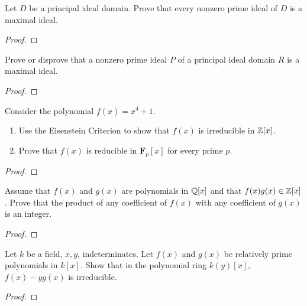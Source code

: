 \begin{problem}
  Let $D$ be a principal ideal domain. Prove that every nonzero
  prime ideal of $D$ is a maximal ideal.
\end{problem}
\begin{proof}
\end{proof}

\begin{problem}
  Prove or disprove that a nonzero prime ideal $P$ of a principal
  ideal domain $R$ is a maximal ideal.
\end{problem}
\begin{proof}
\end{proof}

\begin{problem}
  Consider the polynomial $f(x)=x^4+1$.
  \begin{enumerate}[label=(\alph*)]
  \item Use the Eisenstein Criterion to show that $f(x)$ is
    irreducible in $\mathbb{Z}[x]$.
  \item Prove that $f(x)$ is reducible in $\mathbf{F}_p[x]$ for
    every prime $p$.
  \end{enumerate}
\end{problem}
\begin{proof}
\end{proof}

\begin{problem}
  Assume that $f(x)$ and $g(x)$ are polynomials in $\mathbb{Q}[x]$ and
  that $f(x)g(x)\in\mathbb{Z}[x]$. Prove that the product of any
  coefficient of $f(x)$ with any coefficient of $g(x)$ is an
  integer.
\end{problem}
\begin{proof}
\end{proof}

\begin{problem}
  Let $k$ be a field, $x,y$, indeterminates. Let $f(x)$ and
  $g(x)$ be relatively prime polynomials in $k[x]$. Show that in
  the polynomial ring $k(y)[x]$, $f(x)-yg(x)$ is irreducible.
\end{problem}
\begin{proof}
\end{proof}

